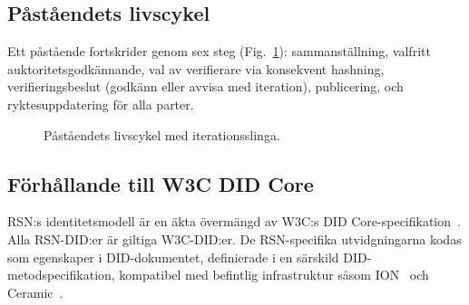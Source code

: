 \documentclass[11pt,a4paper,twocolumn]{article}
\begin{document}
\subsection{Påståendets livscykel}

Ett påstående fortskrider genom sex steg (Fig.~\ref{fig:lifecycle}): sammanställning, valfritt auktoritetsgodkännande, val av verifierare via konsekvent hashning, verifieringsbeslut (godkänn eller avvisa med iteration), publicering, och ryktesuppdatering för alla parter.

\begin{figure}[ht]
\centering
{}
\caption{Påståendets livscykel med iterationsslinga.}
\label{fig:lifecycle}
\end{figure}

\subsection{Förhållande till W3C DID Core}

RSN:s identitetsmodell är en äkta övermängd av W3C:s DID Core-specifikation~\cite{did2022}. Alla RSN-DID:er är giltiga W3C-DID:er. De RSN-specifika utvidgningarna kodas som egenskaper i DID-dokumentet, definierade i en särskild DID-metodspecifikation, kompatibel med befintlig infrastruktur såsom ION~\cite{buchner2021} och Ceramic~\cite{ceramic2023}.

\end{document}
